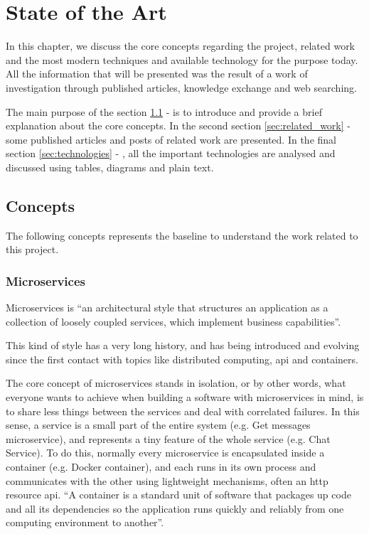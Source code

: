 \glsresetall
\chapter{State of the Art}
\label{chap:state_of_the_art}

In this chapter, we discuss the core concepts regarding the project, related work and the most modern techniques and available technology for the purpose today. All the information that will be presented was the result of a work of investigation through published articles, knowledge exchange and web searching.

The main purpose of the section \ref{sec:concepts} -  is to introduce and provide a brief explanation about the core concepts. In the second section \ref{sec:related_work} -  some published articles and posts of related work are presented. In the final section \ref{sec:technologies} - , all the important technologies are analysed and discussed using tables, diagrams and plain text.

\section{Concepts}
\label{sec:concepts}

The following concepts represents the baseline to understand the work related to this project.

\subsection{Microservices}
\label{subsec:microservices}

Microservices is ``an architectural style that structures an application as a collection of loosely coupled services, which implement business capabilities''\cite{microservices_definition}.

This kind of style has a very long history, and has being introduced and evolving since the first contact with topics like distributed computing, \gls{api} and containers.

The core concept of microservices stands in isolation, or by other words, what everyone wants to achieve when building a software with microservices in mind, is to share less things between the services and deal with correlated failures. In this sense, a service is a small part of the entire system (e.g. Get messages microservice), and represents a tiny feature of the whole service (e.g. Chat Service). To do this, normally every microservice is encapsulated inside a container (e.g. Docker container\cite{docker}), and each runs in its own process and communicates with the other using lightweight mechanisms, often an \gls{http} resource \gls{api}. ``A container is a standard unit of software that packages up code and all its dependencies so the application runs quickly and reliably from one computing environment to another''\cite{what_is_containers}.

